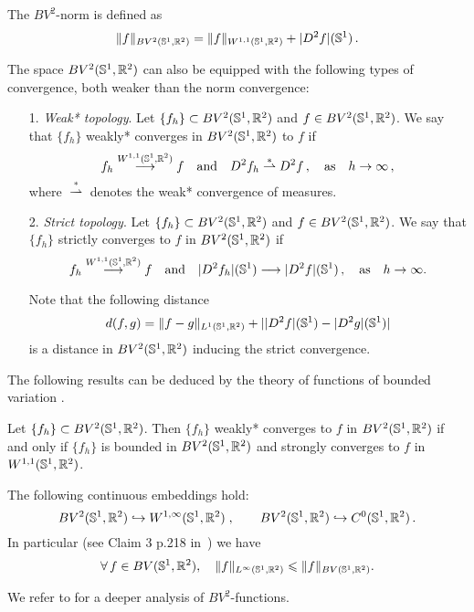 The $BV^2$-norm is defined as
$$\|f\|_{BV^2(\mathbb{S}^1,\mathbb{R}^2)} = \|f\|_{W^{1,1}(\mathbb{S}^1,{\mathbb R}^2)} + |D^2 f|(\mathbb{S}^1)\,.$$

The space $BV^2(\mathbb{S}^1,{\mathbb R}^2)$ can also be equipped with the following types of convergence, both weaker than the norm convergence:

\begin{itemize}
\item[1.] {\em  Weak* topology}. Let $\{f_h\}\subset BV^2(\mathbb{S}^1,{\mathbb R}^2)$ and $f\in BV^2(\mathbb{S}^1,{\mathbb R}^2)$. We say that $\{f_h\}$  weakly* converges in $BV^2(\mathbb{S}^1,{\mathbb R}^2)$ to $f$ if
$$f_h \overset{W^{1,1}(\mathbb{S}^1,{\mathbb R}^2)}{\longrightarrow} f \quad\mbox{and}\quad D^2 f_h \overset{*}{\rightharpoonup}D^2 f\,, \quad\mbox{as}\quad h \rightarrow \infty\,,$$
where $\overset{*}{\rightharpoonup}$ denotes the weak* convergence  of measures.
\item[2.] {\em Strict topology}. Let $\{f_h\}\subset BV^2(\mathbb{S}^1,{\mathbb R}^2)$ and $f\in BV^2(\mathbb{S}^1,{\mathbb R}^2)$. We say that $\{f_h\}$  strictly converges to $f$ in $BV^2(\mathbb{S}^1,{\mathbb R}^2)$ if
$$f_h \overset{W^{1,1}(\mathbb{S}^1,{\mathbb R}^2)}{\longrightarrow} f \quad\mbox{and}\quad |D^2 f_h|(\mathbb{S}^1) \longrightarrow |D^2 f|(\mathbb{S}^1)\,,\quad\mbox{as}\quad h \rightarrow \infty.$$
\par Note that the following distance 
$$d(f,g) = \|f-g\|_{L^1(\mathbb{S}^1,{\mathbb R}^2)} +||D^2f|(\mathbb{S}^1)-|D^2g|(\mathbb{S}^1)|$$
is a distance in $BV^2(\mathbb{S}^1,{\mathbb R}^2)$ inducing the strict convergence. 
\end{itemize}

The following results can be deduced by the theory of functions of  bounded variation \cite{AFP, EG}.

\begin{prop}
Let $\{f_h\}\subset BV^2(\mathbb{S}^1,{\mathbb R}^2)$. Then $\{f_h\}$  weakly* converges  to $f$ in $BV^2(\mathbb{S}^1,{\mathbb R}^2)$ if and only if  $\{f_h\}$ is bounded in $BV^2(\mathbb{S}^1,{\mathbb R}^2)$ and strongly converges to $f$  in $W^{1,1}(\mathbb{S}^1,{\mathbb R}^2)$.
\end{prop}

\begin{prop}[{\bf embedding}]
The following continuous embeddings hold:
$$BV^2(\mathbb{S}^1,\mathbb{R}^2) \hookrightarrow W^{1,\infty}(\mathbb{S}^1,{\mathbb R}^2)\;,\quad \quad BV^2(\mathbb{S}^1,\mathbb{R}^2) \hookrightarrow C^0(\mathbb{S}^1,{\mathbb R}^2)\,.$$
In particular (see Claim 3 p.218 in~\cite{EG}) we have 
\begin{equation}\label{embedding}
	\forall \, f\in BV(\mathbb{S}^1,{\mathbb R}^2), \quad
	\| f \|_{L^\infty(\mathbb{S}^1,{\mathbb R}^2)}\leqslant   \| f \|_{BV(\mathbb{S}^1,{\mathbb R}^2)}.
\end{equation}
\end{prop}
We refer to  \cite{Maitine-BV2} for a deeper analysis of   $BV^2$-functions. \newline \\

